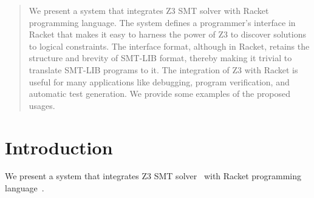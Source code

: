\begin{abstract}
 We present a system that integrates Z3 SMT solver with
 Racket programming language. The system defines a programmer's
 interface in Racket that makes it easy to harness the power
 of Z3 to discover solutions to logical constraints. The
 interface format, although in Racket, retains the structure
 and brevity of SMT-LIB format, thereby making it trivial to
 translate SMT-LIB programs to it. The integration of Z3
 with Racket is useful for many applications like debugging,
 program verification, and automatic test generation. We
 provide some examples of the proposed usages.
\end{abstract}
\section{Introduction}
We present a system that integrates Z3 SMT solver~\cite{z3} with
 Racket programming language~\cite{racket}.
